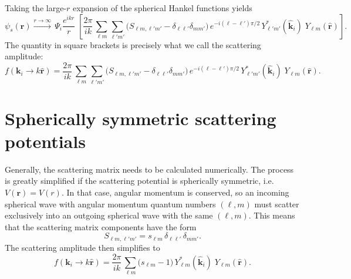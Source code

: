 \documentclass[pra,12pt]{revtex4}
\begin{document}
Taking the large-$r$ expansion of the spherical Hankel functions yields
\begin{equation}
  \psi_s(\mathbf{r}) \overset{r\rightarrow\infty}{\longrightarrow} \, \Psi_i \frac{e^{ikr}}{r} \; \left[ \frac{2 \pi}{ik}\, \sum_{\ell m} \sum_{\ell' m'} \Big(S_{\ell m, \ell' m'} - \delta_{\ell \ell'}\delta_{mm'}\Big) \, e^{-i(\ell-\ell')\pi/2} \, Y_{\ell' m'}^*(\hat{\mathbf{k}}_i)\; Y_{\ell m}(\hat{\mathbf{r}})\right].
\end{equation}
The quantity in square brackets is precisely what we call the
scattering amplitude:
\begin{equation}
  f(\mathbf{k}_i \rightarrow k\hat{\mathbf{r}}) =  \frac{2 \pi}{ik}\, \sum_{\ell m} \sum_{\ell' m'} \Big(S_{\ell m, \ell' m'} - \delta_{\ell \ell'}\delta_{mm'}\Big) \, e^{-i(\ell-\ell')\pi/2} \, Y_{\ell' m'}^*(\hat{\mathbf{k}}_i)\; Y_{\ell m}(\hat{\mathbf{r}}).
\end{equation}

\section{Spherically symmetric scattering potentials}

Generally, the scattering matrix needs to be calculated numerically.
The process is greatly simplified if the scattering potential is
spherically symmetric, i.e.~$V(\mathbf{r}) = V(r)$.  In that case,
angular momentum is conserved, so an incoming spherical wave with
angular momentum quantum numbers $(\ell,m)$ must scatter exclusively
into an outgoing spherical wave with the same $(\ell,m)$.  This means
that the scattering matrix components have the form
\begin{equation}
  S_{\ell m, \ell'm'} = s_{\ell m}\, \delta_{\ell\ell'}\, \delta_{mm'}.
\end{equation}
The scattering amplitude then simplifies to
\begin{equation}
  f(\mathbf{k}_i \rightarrow k\hat{\mathbf{r}}) =  \frac{2 \pi}{ik}\, \sum_{\ell m} \Big(s_{\ell m} - 1\Big) \, Y_{\ell m}^*(\hat{\mathbf{k}}_i)\; Y_{\ell m}(\hat{\mathbf{r}}).
\end{equation}
\end{document}
